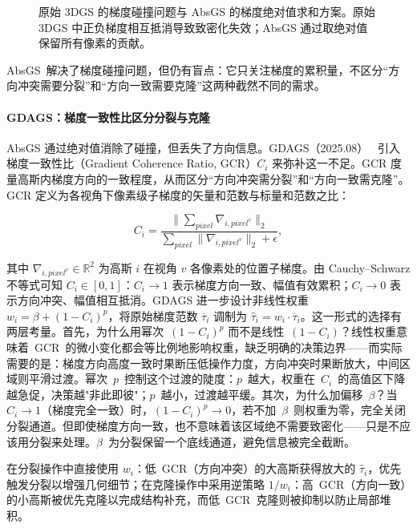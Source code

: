 \begin{figure}[htbp]
\centering
\resizebox{0.85\textwidth}{!}{}
\caption{原始 3DGS 的梯度碰撞问题与 AbsGS 的梯度绝对值求和方案。原始 3DGS 中正负梯度相互抵消导致致密化失效；AbsGS 通过取绝对值保留所有像素的贡献。}
\label{fig:02_absgs}
\end{figure}

AbsGS~解决了梯度碰撞问题，但仍有盲点：它只关注梯度的累积量，不区分“方向冲突需要分裂”和“方向一致需要克隆”这两种截然不同的需求。

\paragraph{GDAGS：梯度一致性比区分分裂与克隆}
AbsGS 通过绝对值消除了碰撞，但丢失了方向信息。GDAGS（2025.08）~\cite{2508_09239} 引入梯度一致性比（Gradient Coherence Ratio, GCR）$C_i$ 来弥补这一不足。GCR 度量高斯内梯度方向的一致程度，从而区分“方向冲突需分裂”和“方向一致需克隆”。GCR 定义为各视角下像素级子梯度的矢量和范数与标量和范数之比：

\begin{equation*}
C_i = \frac{\bigl\|\sum_{pixel}\nabla_{i,pixel^v}\bigr\|_2}{\sum_{pixel}\bigl\|\nabla_{i,pixel^v}\bigr\|_2 + \epsilon},
\end{equation*}

其中 $\nabla_{i,pixel^v} \in \mathbb{R}^2$ 为高斯 $i$ 在视角 $v$ 各像素处的位置子梯度。由 Cauchy--Schwarz 不等式可知 $C_i \in [0,1]$：$C_i \to 1$ 表示梯度方向一致、幅值有效累积；$C_i \to 0$ 表示方向冲突、幅值相互抵消。GDAGS 进一步设计非线性权重 $w_i = \beta + (1-C_i)^p$，将原始梯度范数 $\overline{\tau}_i$ 调制为 $\hat{\tau}_i = w_i \cdot \overline{\tau}_i$。这一形式的选择有两层考量。首先，为什么用幂次~$(1-C_i)^p$ 而不是线性~$(1-C_i)$？线性权重意味着~GCR~的微小变化都会等比例地影响权重，缺乏明确的决策边界——而实际需要的是：梯度方向高度一致时果断压低操作力度，方向冲突时果断放大，中间区域则平滑过渡。幂次~$p$~控制这个过渡的陡度：$p$~越大，权重在~$C_i$~的高值区下降越急促，决策越"非此即彼"；$p$~越小，过渡越平缓。其次，为什么加偏移~$\beta$？当~$C_i \to 1$（梯度完全一致）时，$(1-C_i)^p \to 0$，若不加~$\beta$~则权重为零，完全关闭分裂通道。但即使梯度方向一致，也不意味着该区域绝不需要致密化——只是不应该用分裂来处理。$\beta$~为分裂保留一个底线通道，避免信息被完全截断。

在分裂操作中直接使用 $w_i$：低~GCR（方向冲突）的大高斯获得放大的 $\hat{\tau}_i$，优先触发分裂以增强几何细节；在克隆操作中采用逆策略 $1/w_i$：高~GCR（方向一致）的小高斯被优先克隆以完成结构补充，而低~GCR~克隆则被抑制以防止局部堆积。

